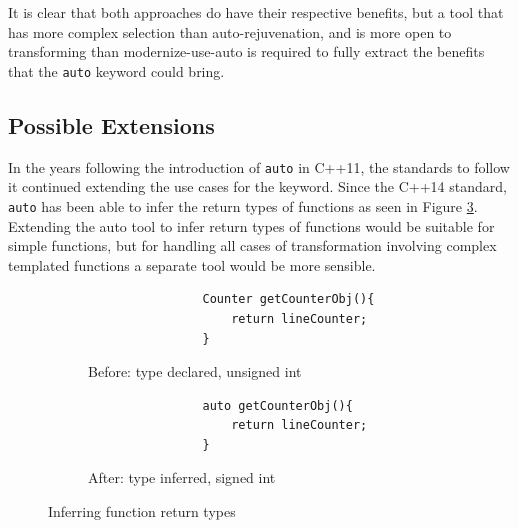\documentclass[bsc,frontabs,singlespacing,twoside,parskip,deptreport]{infthesis}
\begin{document}
It is clear that both approaches do have their respective benefits, but a tool that has more complex selection than auto-rejuvenation, and is more open to transforming than modernize-use-auto is required to fully extract the benefits that the \texttt{auto} keyword could bring.



\subsection{Possible Extensions}
In the years following the introduction of \texttt{auto} in C++11, the standards to follow it continued extending the use cases for the keyword. Since the C++14 standard, \texttt{auto} has been able to infer the return types of functions as seen in Figure \ref{fig:funct-ret-inferred}. Extending the auto tool to infer return types of functions would be suitable for simple functions, but for handling all cases of transformation involving complex templated functions a separate tool would be more sensible.

\begin{figure}[!h]
    \centering
    \begin{subfigure}[h]{\textwidth}
        \centering
        \begin{verbatim}
                Counter getCounterObj(){
                    return lineCounter;
                }
        \end{verbatim}
        \caption{Before: type declared, unsigned int}
        \label{fig:funct-ret-inferred-before}
        \vspace{0.40cm}
    \end{subfigure}
    \begin{subfigure}[h]{\textwidth}
        \centering
        \begin{verbatim}
                auto getCounterObj(){
                    return lineCounter;
                }
        \end{verbatim}
        \caption{After: type inferred, signed int}
        \label{fig:funct-ret-inferred-after}
    \end{subfigure}
    \caption{Inferring function return types}
    \label{fig:funct-ret-inferred}
\end{figure}
\end{document}
